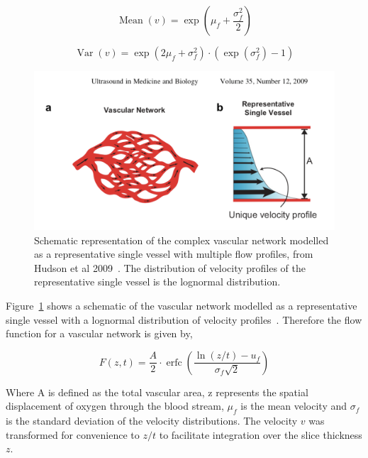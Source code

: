 \begin{equation}
\operatorname{Mean}(v)=\exp \left(\mu_{f}+\frac{\sigma_{f}^{2}}{2}\right)
\end{equation}

\begin{equation}
\operatorname{Var}(v)=\exp \left(2 \mu_{f}+\sigma_{f}^{2}\right)\cdot \left(\exp \left(\sigma_{f}^{2}\right)-1\right)
\end{equation}

\begin{figure}[htbp]
   \centering
   \includegraphics[width=\textwidth]{oemri_thesis2/oemri_thesis2-images/lognormal.png} %
   \caption{Schematic representation of the complex vascular network modelled as a representative single vessel with multiple flow profiles, from Hudson et al 2009~\cite{Hudson:2009jv}. The distribution of velocity profiles of the representative single vessel is the lognormal distribution.}
   \label{lognormal}
\end{figure}

Figure~\ref{lognormal} shows a schematic of the vascular network modelled as a representative single vessel with a lognormal distribution of velocity profiles~.
Therefore the flow function for a vascular network is given by,

\begin{equation}
F(z, t)=\frac{A}{2} \cdot \operatorname{erfc}\left(\frac{\ln (z / t)-u_{f}}{\sigma_{f} \sqrt{2}}\right)
\end{equation}

Where A is defined as the total vascular area, z represents the spatial displacement of oxygen through the blood stream, $\mu_f$ is the mean velocity and $\sigma_f$ is the standard deviation of the velocity distributions. 
The velocity $v$ was transformed for convenience to $z/t$ to facilitate integration over the slice thickness $z$.

